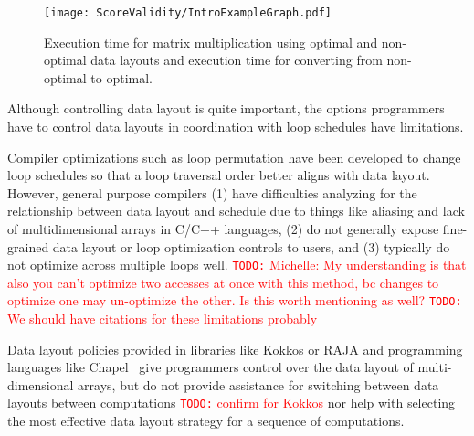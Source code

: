 \documentclass[sigconf, table]{acmart}
\newcommand{\todo}[1]{{\textcolor{red}{{\tt{TODO:}}\,\,#1 }}}
\begin{document}
\begin{figure}
	\texttt{[image: ScoreValidity/IntroExampleGraph.pdf]}
	\caption{Execution time for matrix multiplication using optimal and non-optimal data layouts and execution time for converting from non-optimal to optimal.}
	\label{IntroExample}
\end{figure}




Although controlling data layout is quite important, the options programmers have to control
data layouts in coordination with loop schedules have limitations.

Compiler optimizations such as loop permutation have been developed to change loop
schedules so that a loop traversal order better aligns with data layout.
However, general purpose compilers (1) have difficulties analyzing for the relationship between
data layout and schedule due to things like aliasing and lack of multidimensional arrays in 
C/C++ languages, (2) do not generally expose fine-grained data layout or loop optimization
controls to users, and (3) typically do not optimize across multiple loops well.
\todo{Michelle: My understanding is that also you can't optimize two accesses at once with this method, bc changes to optimize one may un-optimize the other. Is this worth mentioning as well?}
\todo{We should have citations for these limitations probably}

Data layout policies provided in libraries like Kokkos or RAJA
and programming languages like Chapel~\cite{diaconescu2007approach} give
programmers control over the data layout of multi-dimensional arrays, but do not 
provide assistance for switching between data layouts between computations \todo{confirm for Kokkos}
nor help with selecting the most effective data layout strategy for a sequence of computations.
\end{document}
